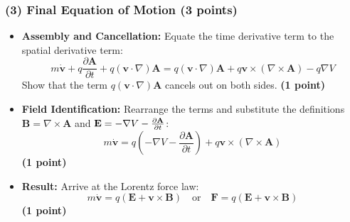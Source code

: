 \documentclass[11pt, a4paper]{article} %
\begin{document}
\subsubsection*{(3) Final Equation of Motion (3 points)}
\begin{itemize}
    \item \textbf{Assembly and Cancellation:}
    Equate the time derivative term to the spatial derivative term:
    \[ m\dot{\mathbf{v}} + q\frac{\partial \mathbf{A}}{\partial t} + q(\mathbf{v} \cdot \nabla)\mathbf{A} = q(\mathbf{v} \cdot \nabla)\mathbf{A} + q\mathbf{v} \times (\nabla \times \mathbf{A}) - q\nabla V \]
    Show that the term $q(\mathbf{v} \cdot \nabla)\mathbf{A}$ cancels out on both sides.
    \hfill \textbf{(1 point)}
    
    \item \textbf{Field Identification:}
    Rearrange the terms and substitute the definitions $\mathbf{B} = \nabla \times \mathbf{A}$ and $\mathbf{E} = -\nabla V - \pdv{\mathbf{A}}{t}$:
    \[ m\dot{\mathbf{v}} = q\left( -\nabla V - \frac{\partial \mathbf{A}}{\partial t} \right) + q\mathbf{v} \times (\nabla \times \mathbf{A}) \]
    \hfill \textbf{(1 point)}
    
    \item \textbf{Result:}
    Arrive at the Lorentz force law:
    \[ m\dot{\mathbf{v}} = q(\mathbf{E} + \mathbf{v} \times \mathbf{B}) \quad \text{or} \quad \mathbf{F} = q(\mathbf{E} + \mathbf{v} \times \mathbf{B}) \]
    \hfill \textbf{(1 point)}
\end{itemize}
\end{document}
